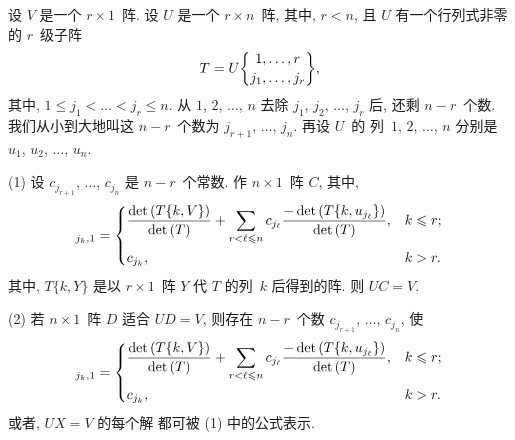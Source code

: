 \documentclass[../libro.tex]{subfiles}
\begin{document}
\begin{theorem}
    设 \(V\) 是一个 \(r \times 1\)~阵.
    设 \(U\) 是一个 \(r \times n\)~阵,
    其中, \(r < n\),
    且 \(U\) 有一个行列式非零的 \(r\)~级子阵
    \begin{align*}
        T = U\submat{1,\dots,r}{j_1,\dots,j_r},
    \end{align*}
    其中, \(1 \leq j_1 < \dots < j_r \leq n\).
    从 \(1\), \(2\), \(\dots\), \(n\)
    去除 \(j_1\), \(j_2\), \(\dots\), \(j_r\)
    后, 还剩 \(n - r\)~个数.
    我们从小到大地叫这 \(n - r\)~个数为
    \(j_{r+1}\), \(\dots\), \(j_n\).
    再设 \(U\)~的%
    列~\(1\), \(2\), \(\dots\), \(n\)
    分别是 \(u_1\), \(u_2\), \(\dots\), \(u_n\).

    (1)
    设 \(c_{j_{r+1}}\), \(\dots\), \(c_{j_n}\)
    是 \(n-r\)~个常数.
    作 \(n \times 1\)~阵 \(C\), 其中,
    \begin{align*}
        [C]_{j_k,1} =
        \begin{dcases}
            \frac{\det {(T\{k,V\})}}{\det {(T)}}
            + \sum_{r < \ell \leq n}
            {c_{j_\ell}
            \frac{-\det {(T\{k,u_{j_\ell}\})}}{\det {(T)}}},
            & k \leq r; \\
            c_{j_k},
            & k > r.
        \end{dcases}
    \end{align*}
    其中, \(T\{k,Y\}\) 是以 \(r \times 1\)~阵 \(Y\)
    代 \(T\) 的列~\(k\) 后得到的阵.
    则 \(UC = V\).

    (2)
    若 \(n \times 1\)~阵 \(D\) 适合 \(UD = V\),
    则存在 \(n-r\)~个数
    \(c_{j_{r+1}}\), \(\dots\), \(c_{j_n}\),
    使
    \begin{align*}
        [D]_{j_k,1} =
        \begin{dcases}
            \frac{\det {(T\{k,V\})}}{\det {(T)}}
            + \sum_{r < \ell \leq n}
            {c_{j_\ell}
            \frac{-\det {(T\{k,u_{j_\ell}\})}}{\det {(T)}}},
            & k \leq r; \\
            c_{j_k},
            & k > r.
        \end{dcases}
    \end{align*}
    或者, \(UX = V\) 的每个解%
    都可被 (1) 中的公式表示.
\end{theorem}
\end{document}
